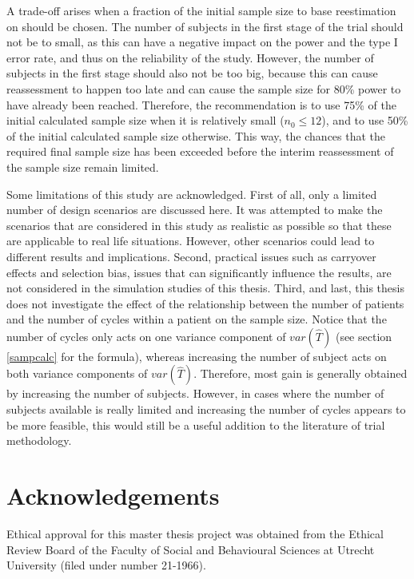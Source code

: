 \documentclass[AMA,STIX1COL,]{WileyNJD-v2}
\begin{document}
A trade-off arises when a fraction of the initial sample size to base reestimation on should be chosen. The number of subjects in the first stage of the trial should not be to small, as this can have a negative impact on the power and the type I error rate, and thus on the reliability of the study. However, the number of subjects in the first stage should also not be too big, because this can cause reassessment to happen too late and can cause the sample size for 80\% power to have already been reached. Therefore, the recommendation is to use 75\% of the initial calculated sample size when it is relatively small (\(n_0 \leq 12\)), and to use 50\% of the initial calculated sample size otherwise. This way, the chances that the required final sample size has been exceeded before the interim reassessment of the sample size remain limited.

Some limitations of this study are acknowledged. First of all, only a limited number of design scenarios are discussed here. It was attempted to make the scenarios that are considered in this study as realistic as possible so that these are applicable to real life situations. However, other scenarios could lead to different results and implications. Second, practical issues such as carryover effects and selection bias, issues that can significantly influence the results, are not considered in the simulation studies of this thesis. Third, and last, this thesis does not investigate the effect of the relationship between the number of patients and the number of cycles within a patient on the sample size. Notice that the number of cycles only acts on one variance component of \(var(\hat{T})\) (see section \ref{sampcalc} for the formula), whereas increasing the number of subject acts on both variance components of \(var(\hat{T})\). Therefore, most gain is generally obtained by increasing the number of subjects. However, in cases where the number of subjects available is really limited and increasing the number of cycles appears to be more feasible, this would still be a useful addition to the literature of trial methodology.

\hypertarget{acknowledgements}{%
\section*{Acknowledgements}\label{acknowledgements}}

Ethical approval for this master thesis project was obtained from the Ethical Review Board of the Faculty of Social and Behavioural Sciences at Utrecht University (filed under number 21-1966).
\end{document}
